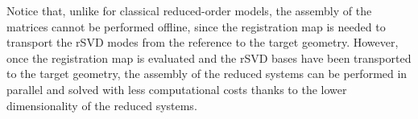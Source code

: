 %
%
\begin{rmk}
Notice that, unlike for classical reduced-order models, the assembly of the matrices cannot be performed offline, since the registration map is needed to transport the rSVD modes from the reference to the target geometry. 
%
However, once the registration map is evaluated and the rSVD bases have been transported to the target geometry, the assembly of the reduced systems can be performed in parallel and solved with less computational costs thanks to the lower dimensionality of the reduced systems. %
\end{rmk}
%

